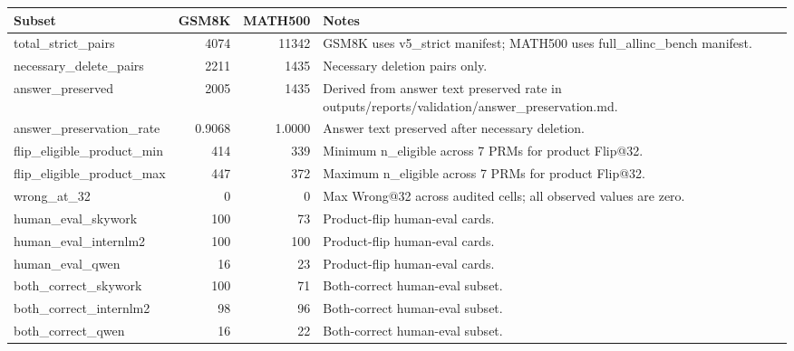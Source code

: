 \begin{tabular}{lrrp{7cm}}
\toprule
Subset & GSM8K & MATH500 & Notes \\
\midrule
total\_strict\_pairs & 4074 & 11342 & GSM8K uses v5\_strict manifest; MATH500 uses full\_allinc\_bench manifest. \\
necessary\_delete\_pairs & 2211 & 1435 & Necessary deletion pairs only. \\
answer\_preserved & 2005 & 1435 & Derived from answer text preserved rate in outputs/reports/validation/answer\_preservation.md. \\
answer\_preservation\_rate & 0.9068 & 1.0000 & Answer text preserved after necessary deletion. \\
flip\_eligible\_product\_min & 414 & 339 & Minimum n\_eligible across 7 PRMs for product Flip@32. \\
flip\_eligible\_product\_max & 447 & 372 & Maximum n\_eligible across 7 PRMs for product Flip@32. \\
wrong\_at\_32 & 0 & 0 & Max Wrong@32 across audited cells; all observed values are zero. \\
human\_eval\_skywork & 100 & 73 & Product-flip human-eval cards. \\
human\_eval\_internlm2 & 100 & 100 & Product-flip human-eval cards. \\
human\_eval\_qwen & 16 & 23 & Product-flip human-eval cards. \\
both\_correct\_skywork & 100 & 71 & Both-correct human-eval subset. \\
both\_correct\_internlm2 & 98 & 96 & Both-correct human-eval subset. \\
both\_correct\_qwen & 16 & 22 & Both-correct human-eval subset. \\
\bottomrule
\end{tabular}
